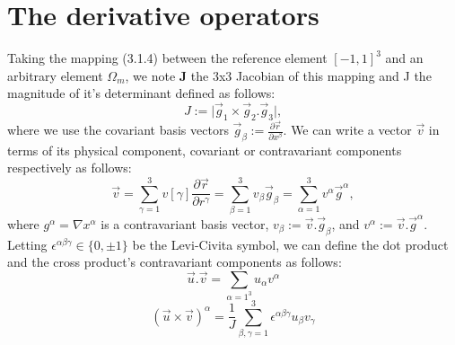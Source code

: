 \documentclass{report}
\numberwithin{equation}{section}
\begin{document}
\section{The derivative operators}
Taking the mapping (3.1.4) between the reference element $[-1,1]^3$ and an arbitrary element $\Omega_m$, we note $\mathbf{J}$ the 3x3 Jacobian of this mapping and J the magnitude of it's determinant defined as follows:
\begin{equation}
    J := \vert \overrightarrow{g}_1 \times \overrightarrow{g}_2 . \overrightarrow{g}_3 \vert,
\end{equation}
where we use the covariant basis vectors $\overrightarrow{g}_{\beta}:= \frac{\partial \overrightarrow{r}}{\partial x^{\beta}}$. We can write a vector $\overrightarrow{v}$ in terms of its physical component, covariant or contravariant components respectively as follows:
\begin{equation}
    \overrightarrow{v}=\sum_{\gamma=1}^3 v[\gamma] \frac{\partial \overrightarrow{r}}{\partial r^{\gamma}} = \sum_{\beta=1}^3 v_{\beta}\overrightarrow{g}_{\beta} = \sum_{\alpha=1}^3 v^{\alpha} \overrightarrow{g}^{\alpha},
\end{equation}
where $g^{\alpha} = \nabla x^{\alpha}$ is a contravariant basis vector, $v_{\beta} := \overrightarrow{v} . \overrightarrow{g}_{\beta}$, and $v^{\alpha}:=\overrightarrow{v} . \overrightarrow{g}^{\alpha}$. Letting $\epsilon^{\alpha \beta \gamma} \in \{0,\pm 1\}$ be the Levi-Civita symbol, we can define the dot product and the cross product's contravariant components as follows:
\begin{equation}
    \overrightarrow{u}.\overrightarrow{v} = \sum_{\alpha=1^3}u_{\alpha}v^{\alpha}
\end{equation}
\begin{equation}
    (\overrightarrow{u} \times \overrightarrow{v})^{\alpha} = \frac{1}{J}\sum_{\beta,\gamma =1}^3 \epsilon^{\alpha \beta \gamma}u_{\beta}v_{\gamma}
\end{equation}
\end{document}
